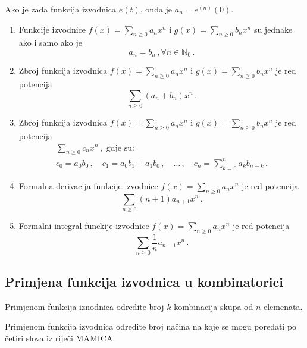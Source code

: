 Ako je zada funkcija izvodnica $e(t)$, onda je $a_n = e^{(n)}(0)$.

\begin{enumerate}
    \item Funkcije izvodnice $f(x) = \sum_{n\geq 0}a_nx^n$ i
    $g(x) = \sum_{n\geq 0}b_nx^n$ su jednake ako i samo ako je
    $$
        a_n = b_n\,, \forall n \in \mathbb{N}_0\,.
    $$
    \item Zbroj funkcija izvodnica $f(x) = \sum_{n\geq 0} a_nx^n$ i
    $g(x) = \sum_{n\geq 0}b_nx^n$ je red potencija
    $$
        \sum_{n\geq 0} (a_n + b_n)x^n\,.
    $$
    \item Zbroj funkcija izvodnica $f(x) = \sum_{n\geq 0} a_nx^n$ i
    $g(x) = \sum_{n\geq 0}b_nx^n$ je red potencija
    \begin{gather*}
        \sum_{n\geq 0} c_nx^n\,, \text{ gdje su:}\\
        c_0=a_0b_0\,,\quad c_1 = a_0b_1 + a_1b_0\,,\quad \dots\,,\quad c_n = \sum_{k=0}^n a_kb_{n-k}\,.
    \end{gather*}

    \item Formalna derivacija funkcije izvodnice $f(x) = \sum_{n\geq 0} a_nx^n$ je red potencija
    $$
        \sum_{n\geq 0} (n+1)a_{n+1}x^n\,.
    $$
    \item Formalni integral funckije izvodnice $f(x) = \sum_{n\geq 0} a_n x^n$ je red potencija
    $$
        \sum_{n\geq 0} \frac{1}{n} a_{n-1}x^n\,.
    $$
\end{enumerate}

\subsection{Primjena funkcija izvodnica u kombinatorici}

\begin{example}
    Primjenom funkcija iznodnica odredite broj $k$-kombinacija skupa od $n$ elemenata.
\end{example}

\begin{example}
    Primjenom funkcija izvodnica odredite broj načina na koje se mogu poredati po četiri slova iz riječi $\mathrm{MAMICA}$.
\end{example}
